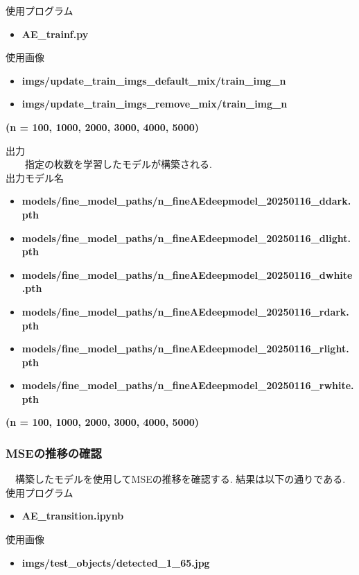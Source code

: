 \documentclass[a4paper, 12pt]{report}
\begin{document}
使用プログラム
\begin{itemize}
    \item \textbf{AE\_trainf.py}
\end{itemize}

使用画像
\begin{itemize}
    \item \textbf{imgs/update\_train\_imgs\_default\_mix/train\_img\_n}
    \item \textbf{imgs/update\_train\_imgs\_remove\_mix/train\_img\_n}
\end{itemize}
\textbf{\hspace{2.0em}(n = 100, 1000, 2000, 3000, 4000, 5000)}

出力\\
　　指定の枚数を学習したモデルが構築される.\\ 

出力モデル名
\begin{itemize}
    \item \textbf{models/fine\_model\_paths/n\_fineAEdeepmodel\_20250116\_ddark.pth}
    \item \textbf{models/fine\_model\_paths/n\_fineAEdeepmodel\_20250116\_dlight.pth}
    \item \textbf{models/fine\_model\_paths/n\_fineAEdeepmodel\_20250116\_dwhite.pth}
    \item \textbf{models/fine\_model\_paths/n\_fineAEdeepmodel\_20250116\_rdark.pth}
    \item \textbf{models/fine\_model\_paths/n\_fineAEdeepmodel\_20250116\_rlight.pth}
    \item \textbf{models/fine\_model\_paths/n\_fineAEdeepmodel\_20250116\_rwhite.pth}
\end{itemize}
\textbf{\hspace{2.0em}(n = 100, 1000, 2000, 3000, 4000, 5000)}

\subsubsection{MSEの推移の確認}
　構築したモデルを使用してMSEの推移を確認する. 結果は以下の通りである. \\

使用プログラム
\begin{itemize}
    \item \textbf{AE\_transition.ipynb}
\end{itemize}

使用画像
\begin{itemize}
    \item \textbf{imgs/test\_objects/detected\_1\_65.jpg}
\end{itemize}
\end{document}
